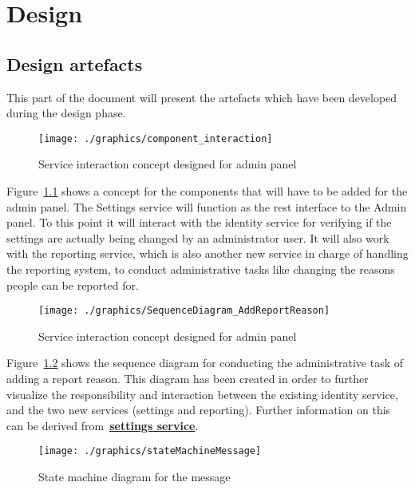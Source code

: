 

\chapter{Design}\label{ch:design}


\section{Design artefacts}\label{sec:design-artefacts}

This part of the document will present the artefacts which have been developed during the design phase.

\begin{figure}[h]
    \centering
    \texttt{[image: ./graphics/component\_interaction]}
    \caption{Service interaction concept designed for admin panel}
    \label{fig:componentInteraction}
\end{figure}

Figure~\ref{fig:componentInteraction} shows a concept for the components that will have to be added for the admin panel.
The Settings service will function as the rest interface to the Admin panel.
To this point it will interact with the identity service for verifying if the settings are actually being changed by an
administrator user.
It will also work with the reporting service, which is also another new service in charge of handling the reporting
system, to conduct administrative tasks like changing the reasons people can be reported for.

\begin{figure}[h]
    \centering
    \texttt{[image: ./graphics/SequenceDiagram\_AddReportReason]}
    \caption{Service interaction concept designed for admin panel}
    \label{fig:sequenceDiagramAddReportReason}
\end{figure}

Figure~\ref{fig:sequenceDiagramAddReportReason} shows the sequence diagram for conducting the administrative task of
adding a report reason.
This diagram has been created in order to further visualize the responsibility and interaction between the existing
identity service, and the two new services (settings and reporting).
Further information on this can be derived from~\hyperref[subsubsec:settingsSer]{\textbf{settings service}}.

\begin{figure}[h]
    \centering
    \texttt{[image: ./graphics/stateMachineMessage]}
    \caption{State machine diagram for the message}
    \label{fig:stateMachineMessage}
\end{figure}

